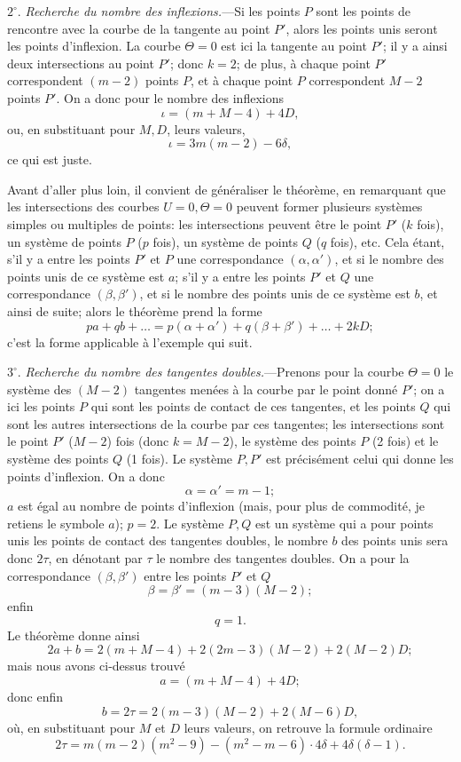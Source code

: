 \documentclass[11pt]{article}
\begin{document}
$2^\circ$. \emph{Recherche du nombre des inflexions.}---Si les points $P$ sont les points de rencontre avec la courbe de la tangente au point $P'$, alors les points unis seront les points d'inflexion. La courbe $\Theta = 0$ est ici la tangente au point $P'$; il y a ainsi deux intersections au point $P'$; donc $k = 2$; de plus, \`a chaque point $P'$ correspondent $(m - 2)$ points $P$, et \`a chaque point $P$ correspondent $M - 2$ points $P'$. On a donc pour le nombre des inflexions
\[ \iota = (m + M - 4) + 4D, \]
ou, en substituant pour $M, D$, leurs valeurs,
\[ \iota = 3m(m - 2) - 6\delta, \]
ce qui est juste.

Avant d'aller plus loin, il convient de g\'en\'eraliser le th\'eor\`eme, en remarquant que les intersections des courbes $U = 0, \Theta = 0$ peuvent former plusieurs syst\`emes simples ou multiples de points: les intersections peuvent \^etre le point $P'$ ($k$ fois), un syst\`eme de points $P$ ($p$ fois), un syst\`eme de points $Q$ ($q$ fois), etc. Cela \'etant, s'il y a entre les points $P'$ et $P$ une correspondance $(\alpha, \alpha')$, et si le nombre des points unis de ce syst\`eme est $a$; s'il y a entre les points $P'$ et $Q$ une correspondance $(\beta, \beta')$, et si le nombre des points unis de ce syst\`eme est $b$, et ainsi de suite; alors le th\'eor\`eme prend la forme
\[ pa + qb + \ldots = p(\alpha + \alpha') + q(\beta + \beta') + \ldots + 2kD; \]
c'est la forme applicable \`a l'exemple qui suit.

$3^\circ$. \emph{Recherche du nombre des tangentes doubles.}---Prenons pour la courbe $\Theta = 0$ le syst\`eme des $(M - 2)$ tangentes men\'ees \`a la courbe par le point donn\'e $P'$; on a ici les points $P$ qui sont les points de contact de ces tangentes, et les points $Q$ qui sont les autres intersections de la courbe par ces tangentes; les intersections sont le point $P'$ ($M - 2$) fois (donc $k = M - 2$), le syst\`eme des points $P$ (2 fois) et le syst\`eme des points $Q$ (1 fois). Le syst\`eme $P, P'$ est pr\'ecis\'ement celui qui donne les points d'inflexion. On a donc
\[ \alpha = \alpha' = m - 1; \]
$a$ est \'egal au nombre de points d'inflexion (mais, pour plus de commodit\'e, je retiens le symbole $a$); $p = 2$. Le syst\`eme $P, Q$ est un syst\`eme qui a pour points unis les points de contact des tangentes doubles, le nombre $b$ des points unis sera donc $2\tau$, en d\'enotant par $\tau$ le nombre des tangentes doubles. On a pour la correspondance $(\beta, \beta')$ entre les points $P'$ et $Q$
\[ \beta = \beta' = (m - 3)(M - 2); \]
enfin
\[ q = 1. \]
Le th\'eor\`eme donne ainsi
\[ 2a + b = 2(m + M - 4) + 2(2m - 3)(M - 2) + 2(M - 2)D; \]
mais nous avons ci-dessus trouv\'e
\[ a = (m + M - 4) + 4D; \]
donc enfin
\[ b = 2\tau = 2(m - 3)(M - 2) + 2(M - 6)D, \]
o\`u, en substituant pour $M$ et $D$ leurs valeurs, on retrouve la formule ordinaire
\[ 2\tau = m(m - 2)(m^2 - 9) - (m^2 - m - 6)\cdot 4\delta + 4\delta(\delta - 1). \]
\end{document}
